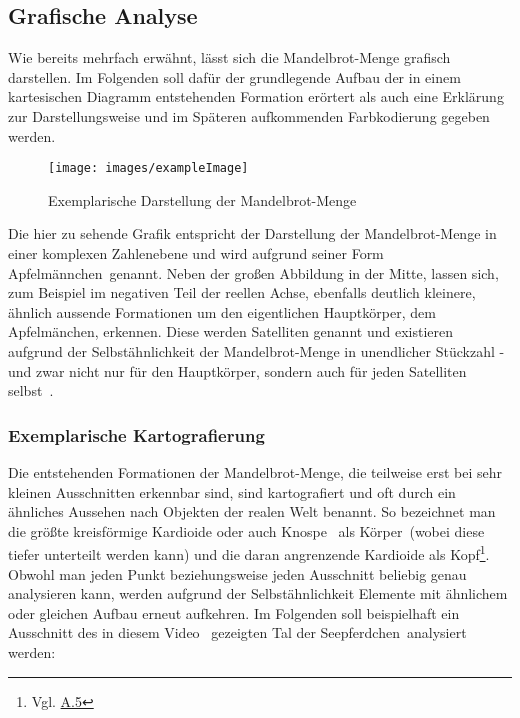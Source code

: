 \subsection{Grafische Analyse}\label{subsec:graphical-analysis}

Wie bereits mehrfach erwähnt, lässt sich die Mandelbrot-Menge grafisch darstellen.
Im Folgenden soll dafür der grundlegende Aufbau der in einem kartesischen Diagramm
entstehenden Formation erörtert als auch eine Erklärung zur Darstellungsweise
und im Späteren aufkommenden Farbkodierung gegeben werden.

\bigskip
\begin{figure}[h!]\label{fig:mandelbrot-set}
\begin{center}
  \texttt{[image: images/exampleImage]}
  \caption[Caption for LOF]{
    Exemplarische Darstellung der Mandelbrot-Menge\footnotemark
  }
\end{center}
\end{figure}

Die hier zu sehende Grafik entspricht der Darstellung der Mandelbrot-Menge
in einer komplexen Zahlenebene und wird aufgrund seiner Form
\glqq Apfelm\"annchen\grqq~genannt.
Neben der großen Abbildung in der Mitte, lassen sich,
zum Beispiel im negativen Teil der reellen Achse,
ebenfalls deutlich kleinere, ähnlich aussende Formationen um den
eigentlichen Hauptkörper, dem Apfelm\"anchen, erkennen.
Diese werden Satelliten genannt und existieren aufgrund der Selbstähnlichkeit
der Mandelbrot-Menge in unendlicher Stückzahl - und zwar nicht nur für den Hauptkörper,
sondern auch für jeden Satelliten selbst~\cite{lomonaco_quasi-conformal_2018}.

\subsubsection{Exemplarische Kartografierung}

Die entstehenden Formationen der Mandelbrot-Menge, die teilweise erst bei sehr
kleinen Ausschnitten erkennbar sind, sind kartografiert und oft durch
ein ähnliches Aussehen nach Objekten der realen Welt benannt.
So bezeichnet man die größte kreisförmige Kardioide oder auch \glqq Knospe\grqq
~als \glqq K\"orper\grqq~(wobei diese tiefer unterteilt werden kann)
und die daran angrenzende Kardioide als
\glqq Kopf\grqq\footnote{Vgl. \hyperref[app:5]{A.5}}.
Obwohl man jeden Punkt beziehungsweise jeden Ausschnitt beliebig genau
analysieren kann, werden aufgrund der Selbstähnlichkeit Elemente mit ähnlichem
oder gleichen Aufbau erneut aufkehren.
Im Folgenden soll beispielhaft ein Ausschnitt des in diesem
Video~\cite{beyer_zoomfahrt_2017} gezeigten
\glqq Tal der Seepferdchen\grqq~analysiert werden:

